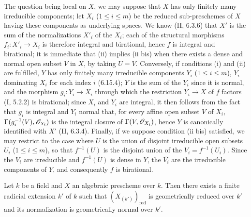 The question being local on $X$, we may suppose that $X$ has only finitely many irreducible components; let $X_i$ ($1\leq i\leq m$) be the reduced sub-preschemes of $X$ having these components as underlying spaces. We know (II, 6.3.6) that $X'$ is the sum of the normalizations $X'_i$ of the $X_i$; each of the structural morphisms $f_i:X'_i\to X_i$ is therefore integral and birational, hence $f$ is integral and birational; it is immediate that (ii) implies (ii bis) when there exists a dense and normal open subset $V$ in $X$, by taking $U=V$. Conversely, if conditions (i) and (ii) are fulfilled, $Y$ has only finitely many irreducible components $Y_i$ ($1\leq i\leq m$), $Y_i$ dominating $X_i$ for each index $i$ (6.15.4); $Y$ is the sum of the $Y_i$ since it is normal, and the morphism $g_i:Y_i\to X_i$ through which the restriction $Y_i\to X$ of $f$ factors (I, 5.2.2) is birational; since $X_i$ and $Y_i$ are integral, it then follows from the fact that $g_i$ is integral and $Y_i$ normal that, for every affine open subset $V$ of $X_i$, $\Gamma(g_i^{-1}(V),\mathscr{O}_{Y_i})$ is the integral closure of $\Gamma(V,\mathscr{O}_{X_i})$, hence $Y$ is canonically identified with $X'$ (II, 6.3.4). Finally, if we suppose condition (ii bis) satisfied, we may restrict to the case where $U$ is the union of disjoint irreducible open subsets $U_i$ ($1\leq i\leq m$), so that $f^{-1}(U)$ is the disjoint union of the $V_i=f^{-1}(U_i)$. Since the $V_i$ are irreducible and $f^{-1}(U)$ is dense in $Y$, the $\overline{V_i}$ are the irreducible components of $Y$, and consequently $f$ is birational.

\begin{lemma}[17.15.14.2]
\label{IV.17.15.14.2}
Let $k$ be a field and $X$ an algebraic prescheme over $k$. Then there exists a finite radicial extension $k'$ of $k$ such that $(X_{(k')})_{\mathrm{red}}$ is geometrically reduced over $k'$ and its normalization is geometrically normal over $k'$.
\end{lemma}

